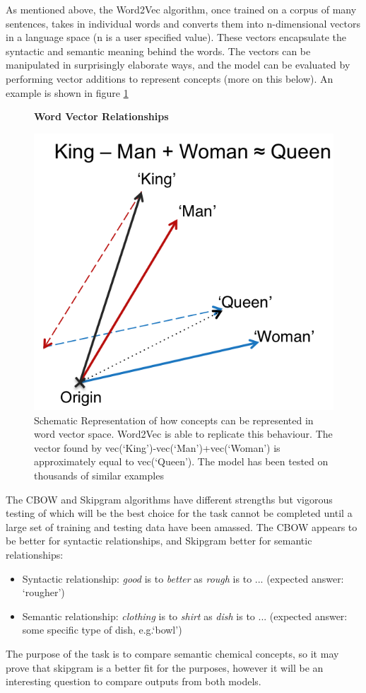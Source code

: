\documentclass[11pt, oneside]{article}   	%
\begin{document}
As mentioned above, the Word2Vec algorithm, once trained on a corpus of many sentences, takes in individual words and converts them into n-dimensional vectors in a language space (n is a user specified value). These vectors encapsulate the syntactic and semantic meaning behind the words. The vectors can be manipulated in surprisingly elaborate ways, and the model can be evaluated by performing vector additions to represent concepts (more on this below). An example is shown in figure \ref{fig:KINGQUEEN}
\begin{figure}[H]
    \centering
    \textbf{Word Vector Relationships}\par\medskip
    \includegraphics[scale=0.7]{KINGQUEEN.png}
    \caption{Schematic Representation of how concepts can be represented in word vector space. Word2Vec is able to replicate this behaviour. The vector found by vec(`King')-vec(`Man')+vec(`Woman') is approximately equal to vec(`Queen'). The model has been tested on thousands of similar examples\cite{WORD2VEC}  \label{fig:KINGQUEEN}}
\end{figure}
  

 The CBOW and Skipgram algorithms have different strengths but vigorous testing of which will be the best choice for the task cannot be completed until a large set of training and testing data have been amassed. The CBOW appears to be better for syntactic relationships, and Skipgram better for semantic relationships\cite{WORD2VEC}:
\begin{itemize}
\item Syntactic relationship: \emph{good} is to \emph{better} as \emph{rough} is to ... (expected answer: `rougher')  \cite{LINGUISTICREG}
\item Semantic relationship: \emph{clothing} is to \emph{shirt} as \emph{dish} is to ... (expected answer: some specific type of dish, e.g.`bowl')  \cite{LINGUISTICREG}
\end{itemize}
The purpose of the task is to compare semantic chemical concepts, so it may prove that skipgram is a better fit for the purposes, however it will be an interesting question to compare outputs from both models.
\end{document}
